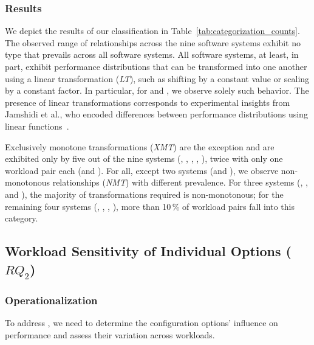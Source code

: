 {{\subsubsection{Results}
{\color{edited}
We depict the results of our classification in Table~\ref{tab:categorization_counts}. The observed range of relationships across the nine software systems exhibit no type that prevails across all software systems. 
All software systems, at least, in part, exhibit performance distributions that can be transformed into one another using a linear transformation (\textit{\colorbox{lt-color}{LT}}), such as shifting by a constant value or scaling by a constant factor. In particular, for \jumper and \xzwo, we observe solely such behavior. The presence of linear transformations corresponds to experimental insights from Jamshidi et al., who encoded differences between performance distributions using linear functions~\cite{jamishidi_transfer_2017}.

Exclusively monotone transformations (\textit{\colorbox{xmt-color}{XMT}}) are the exception and are exhibited only by five out of the nine systems (\kanzi, \batik, \xz, \lrzip, \zdrei), twice with only one workload pair each (\xz and \zdrei).  
For all, except two systems (\jumper and \xzwo), we observe non-monotonous relationships (\textit{\colorbox{nmt-color}{NMT}}) with different prevalence.  For three systems (\dconvert, \htwo, and \zdrei), the majority of transformations required is non-monotonous; for the remaining four systems (\kanzi, \batik, \xz, \lrzip), more than 10\,\% of workload pairs fall into this category.

\vspace{1mm}

\subsection{Workload Sensitivity of Individual Options ($RQ_2$)}\label{sec:rq2}

\subsubsection{Operationalization}
To address , we need to determine the configuration options’ influence on performance and assess their variation across workloads. 

}}}
